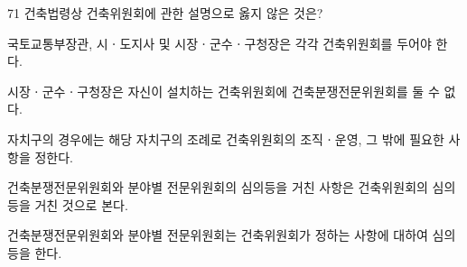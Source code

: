 \begin{question}{71}
건축법령상 건축위원회에 관한 설명으로 옳지 않은 것은?
\begin{choices}
  \item 국토교통부장관, 시ㆍ도지사 및 시장ㆍ군수ㆍ구청장은 각각 건축위원회를 두어야 한다.
  \item 시장ㆍ군수ㆍ구청장은 자신이 설치하는 건축위원회에 건축분쟁전문위원회를 둘 수 없다.
  \item 자치구의 경우에는 해당 자치구의 조례로 건축위원회의 조직ㆍ운영, 그 밖에 필요한 사항을 정한다.
  \item 건축분쟁전문위원회와 분야별 전문위원회의 심의등을 거친 사항은 건축위원회의 심의등을 거친 것으로 본다.
  \item 건축분쟁전문위원회와 분야별 전문위원회는 건축위원회가 정하는 사항에 대하여 심의등을 한다.
\end{choices}
\end{question}
